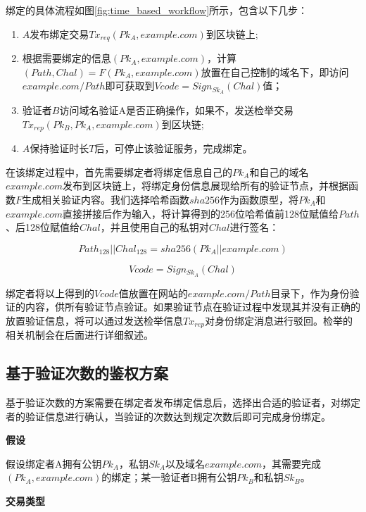 绑定的具体流程如图\ref{fig:time_based_workflow}所示，包含以下几步：

\begin{enumerate}
	\item $A$发布绑定交易$Tx_{req}(Pk_A, example.com)$到区块链上;
	\item 根据需要绑定的信息$(Pk_A, example.com)$，计算$(Path, Chal) = F(Pk_A, example.com)$放置在自己控制的域名下，即访问$example.com/Path$即可获取到$Vcode = Sign_{Sk_A}(Chal)$值；
	\item 验证者$B$访问域名验证A是否正确操作，如果不，发送检举交易$Tx_{rep}(Pk_B, Pk_A, example.com)$到区块链;
	\item $A$保持验证时长$T$后，可停止该验证服务，完成绑定。
\end{enumerate}


在该绑定过程中，首先需要绑定者将绑定信息自己的$Pk_A$和自己的域名$example.com$发布到区块链上，将绑定身份信息展现给所有的验证节点，并根据函数$F$生成相关验证内容。我们选择哈希函数$sha256$作为函数原型，将$Pk_A$和$example.com$直接拼接后作为输入，将计算得到的256位哈希值前128位赋值给$Path$、后128位赋值给$Chal$，并且使用自己的私钥对$Chal$进行签名：

\begin{equation}\label{eqF}
Path_{128}||Chal_{128} = sha256(Pk_A||example.com)
\end{equation}

\begin{equation}\label{eqSign}
Vcode = Sign_{Sk_A}(Chal)
\end{equation}

绑定者将以上得到的$Vcode$值放置在网站的$example.com/Path$目录下，作为身份验证的内容，供所有验证节点验证。如果验证节点在验证过程中发现其并没有正确的放置验证信息，将可以通过发送检举信息$Tx_{rep}$对身份绑定消息进行驳回。检举的相关机制会在后面进行详细叙述。


\subsection{基于验证次数的鉴权方案}\label{ver_num}

基于验证次数的方案需要在绑定者发布绑定信息后，选择出合适的验证者，对绑定者的验证信息进行确认，当验证的次数达到规定次数后即可完成身份绑定。

\noindent\textbf{假设}

假设绑定者A拥有公钥$Pk_A$，私钥$Sk_A$以及域名$example.com$，其需要完成$(Pk_A, example.com)$的绑定；某一验证者B拥有公钥$Pk_B$和私钥$Sk_B$。

\noindent\textbf{交易类型}


